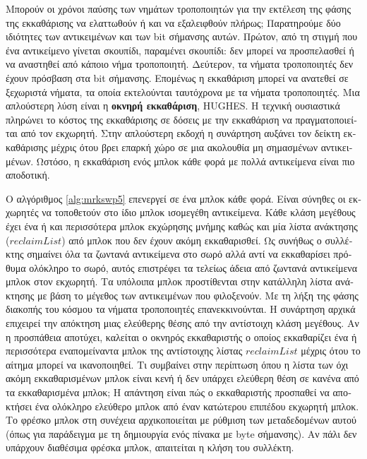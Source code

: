 \begin{greek}
Μπορούν οι χρόνοι παύσης των νημάτων τροποποιητών για την εκτέλεση 
της φάσης της εκκαθάρισης να ελαττωθούν ή και να εξαλειφθούν 
πλήρως; Παρατηρούμε δύο ιδιότητες των αντικειμένων και των bit
σήμανσης αυτών. Πρώτον, από τη στιγμή που ένα αντικείμενο γίνεται
σκουπίδι, παραμένει σκουπίδι: δεν μπορεί να προσπελασθεί ή να
αναστηθεί από κάποιο νήμα τροποποιητή. Δεύτερον, τα νήματα
τροποποιητές δεν έχουν πρόσβαση στα bit σήμανσης. Επομένως η
εκκαθάριση μπορεί να ανατεθεί σε ξεχωριστά νήματα, τα οποία 
εκτελούνται ταυτόχρονα με τα νήματα τροποποιητές. Μια απλούστερη
λύση είναι η \textbf{οκνηρή εκκαθάριση}, HUGHES.
Η τεχνική ουσιαστικά πληρώνει το κόστος της εκκαθάρισης σε δόσεις 
με την εκκαθάριση να πραγματοποιείται από τον εκχωρητή. Στην 
απλούστερη εκδοχή η συνάρτηση  αυξάνει τον
δείκτη εκκαθάρισης μέχρις ότου βρει επαρκή χώρο σε μια ακολουθία
μη σημασμένων αντικειμένων. Ωστόσο, η εκκαθάριση ενός μπλοκ κάθε 
φορά με πολλά αντικείμενα είναι πιο αποδοτική. 

Ο αλγόριθμος \ref{alg:mrkswp5} επενεργεί σε ένα μπλοκ κάθε 
φορά. Είναι σύνηθες οι εκχωρητές να τοποθετούν στο ίδιο μπλοκ
ισομεγέθη αντικείμενα. Κάθε κλάση μεγέθους έχει ένα ή και 
περισσότερα μπλοκ εκχώρησης μνήμης καθώς και μία λίστα ανάκτησης
($reclaimList$) από μπλοκ που δεν έχουν ακόμη εκκαθαρισθεί.
Ως συνήθως ο συλλέκτης σημαίνει όλα τα ζωντανά αντικείμενα στο 
σωρό αλλά αντί να εκκαθαρίσει πρόθυμα ολόκληρο το σωρό, αυτός
επιστρέφει τα τελείως άδεια από ζωντανά αντικείμενα μπλοκ στον
εκχωρητή. Τα υπόλοιπα μπλοκ προστίθενται στην κατάλληλη λίστα
ανάκτησης με βάση το μέγεθος των αντικειμένων που φιλοξενούν.
Με τη λήξη της φάσης διακοπής του κόσμου τα νήματα τροποποιητές
επανεκκινούνται. Η συνάρτηση  αρχικά επιχειρεί
την απόκτηση μιας ελεύθερης θέσης από την αντίστοιχη κλάση 
μεγέθους. Αν η προσπάθεια αποτύχει, καλείται ο οκνηρός εκκαθαριστής
ο οποίος εκκαθαρίζει ένα ή περισσότερα εναπομείναντα μπλοκ της
αντίστοιχης λίστας $reclaimList$ μέχρις ότου το αίτημα μπορεί
να ικανοποιηθεί. Τι συμβαίνει στην περίπτωση όπου η λίστα των
όχι ακόμη εκκαθαρισμένων μπλοκ είναι κενή ή δεν υπάρχει ελεύθερη
θέση σε κανένα από τα εκκαθαρισμένα μπλοκ; Η απάντηση είναι πώς
ο εκκαθαριστής προσπαθεί να αποκτήσει ένα ολόκληρο ελεύθερο μπλοκ
από έναν κατώτερου επιπέδου εκχωρητή μπλοκ. Το φρέσκο μπλοκ
στη συνέχεια αρχικοποιείται με ρύθμιση των μεταδεδομένων αυτού
(όπως για παράδειγμα με τη δημιουργία ενός πίνακα με byte σήμανσης).
Αν πάλι δεν υπάρχουν διαθέσιμα φρέσκα μπλοκ, απαιτείται η κλήση
του συλλέκτη.


\end{greek}
